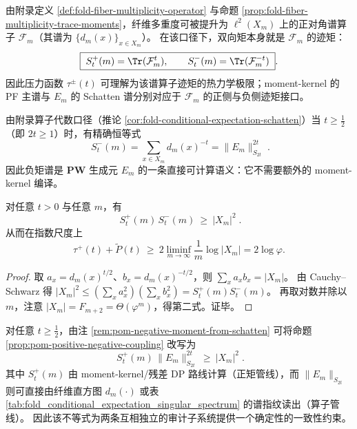 \begin{remark}[空间损失的谱算子实现：\texorpdfstring{$\mathcal{F}_m=(E_mE_m^\ast)^{-1}$}{Fm=(EmEm*)^{-1}}]\label{rem:pom-fiber-loss-as-spectral-operator}
由附录定义 \ref{def:fold-fiber-multiplicity-operator} 与命题 \ref{prop:fold-fiber-multiplicity-trace-moments}，纤维多重度可被提升为 \(\ell^2(X_m)\) 上的正对角谱算子 \(\mathcal{F}_m\)（其谱为 \(\{d_m(x)\}_{x\in X_m}\)）。
在该口径下，双向矩本身就是 \(\mathcal{F}_m\) 的迹矩：
$$
\boxed{\;
S^{+}_{t}(m)=\Tr(\mathcal{F}_m^{t}),\qquad
S^{-}_{t}(m)=\Tr(\mathcal{F}_m^{-t})\; }.
$$
因此压力函数 \(\tau^{\pm}(t)\) 可理解为该谱算子迹矩的热力学极限；moment-kernel 的 PF 主谱与 \(E_m\) 的 Schatten 谱分别对应于 \(\mathcal{F}_m\) 的正侧与负侧迹矩接口。
\end{remark}

\begin{remark}\label{rem:pom-negative-moment-from-schatten}
由附录算子代数口径（推论 \ref{cor:fold-conditional-expectation-schatten}）当 \(t\ge \frac12\)（即 \(2t\ge 1\)）时，有精确恒等式
$$
\boxed{\;
S^{-}_{t}(m)=\sum_{x\in X_m}d_m(x)^{-t}=\|E_m\|_{S_{2t}}^{2t}\;}.
$$
因此负矩谱是 \(\mathbf{PW}\) 生成元 \(E_m\) 的一条直接可计算语义：它不需要额外的 moment-kernel 编译。
\end{remark}

\begin{proposition}\label{prop:pom-positive-negative-coupling}
对任意 \(t>0\) 与任意 \(m\)，有
$$
\boxed{\;
S^{+}_{t}(m)\,S^{-}_{t}(m)\ \ge\ |X_m|^2\; }.
$$
从而在指数尺度上
$$
\tau^{+}(t)+\widetilde P(t)\ \ge\ 2\liminf_{m\to\infty}\frac{1}{m}\log|X_m|
=2\log\varphi.
$$
\end{proposition}
\begin{proof}
取 \(a_x=d_m(x)^{t/2}\)、\(b_x=d_m(x)^{-t/2}\)，则 \(\sum_x a_xb_x=|X_m|\)。
由 Cauchy--Schwarz 得
\(
|X_m|^2\le (\sum_x a_x^2)(\sum_x b_x^2)=S_t^+(m)S_t^-(m)
\)。
再取对数并除以 \(m\)，注意 \(|X_m|=F_{m+2}=\Theta(\varphi^m)\)，得第二式。证毕。
\end{proof}

\begin{remark}[双管线交叉审计不等式]\label{rem:pom-positive-negative-cross-audit}
对任意 \(t\ge \frac12\)，由注 \ref{rem:pom-negative-moment-from-schatten} 可将命题 \ref{prop:pom-positive-negative-coupling} 改写为
$$
\boxed{\;
S^{+}_{t}(m)\,\|E_m\|_{S_{2t}}^{2t}\ \ge\ |X_m|^2\; }.
$$
其中 \(S_t^{+}(m)\) 由 moment-kernel/残差 DP 路线计算（正矩管线），而 \(\|E_m\|_{S_{2t}}\) 则可直接由纤维直方图 \(d_m(\cdot)\) 或表 \ref{tab:fold_conditional_expectation_singular_spectrum} 的谱指纹读出（算子管线）。
因此该不等式为两条互相独立的审计子系统提供一个确定性的一致性约束。
\end{remark}

